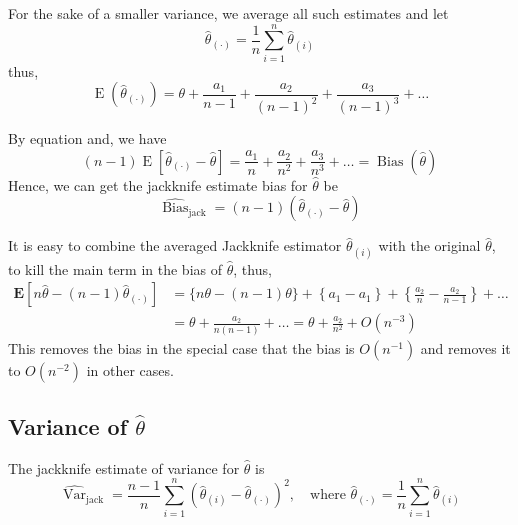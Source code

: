 For the sake of a smaller variance, we average all such estimates and let
\begin{equation}
    \hat{\theta}_{(\cdot)}=\frac{1}{n}\sum_{i=1}^{n}\hat{\theta}_{(i)}
\end{equation}
thus,
\begin{equation}
    \operatorname{E}(\hat{\theta}_{(\cdot)})=\theta+\frac{a_{1}}{n-1}+\frac{a_{2}}{\left(n-1\right)^{2}}+\frac{a_{3}}{\left(n-1\right)^{3}}+\ldots
\end{equation}

By equation and, we have
\begin{equation}
    (n-1)\operatorname{E}\left[\hat{\theta}_{(\cdot)}-\hat{\theta}\right]=\frac{a_{1}}{n}+\frac{a_{2}}{n^{2}}+\frac{a_{3}}{n^{3}}+\ldots=\operatorname{Bias}(\hat{\theta})
\end{equation}
Hence, we can get the jackknife estimate bias for $\hat{\theta}$ be
\begin{equation}
    \widehat{\operatorname{Bias}}_{\text{jack}}=(n-1)\left(\hat{\theta}_{(\cdot)}-\hat{\theta}\right)
\end{equation}

\begin{remark}
    It is easy to combine the averaged Jackknife estimator $\hat{\theta}_{(i)}$ with the original $\hat{\theta}$, to kill the main term in the bias of $\hat{\theta}$, thus,
    \begin{equation}
        \begin{aligned}
            \mathbf{E}\left[n\hat{\theta}-(n-1)\hat{\theta}_{(\mathbf{\cdot})}\right] & =\{n\theta-(n-1)\theta\}+\left\{a_{1}-a_{1}\right\}+\left\{\frac{a_{2}}{n}-\frac{a_{2}}{n-1}\right\}+\ldots \\
                                                                                      & =\theta+\frac{a_{2}}{n(n-1)}+\ldots=\theta+\frac{a_{2}}{n^{2}}+O\left(n^{-3}\right)
        \end{aligned}
    \end{equation}
    This removes the bias in the special case that the bias is $O\left(n^{-1}\right)$ and removes it to $O\left(n^{-2}\right)$ in other cases.
\end{remark}

\subsection{Variance of $\hat{\theta}$}

The jackknife estimate of variance for $\hat{\theta}$ is
\begin{equation}
    \widehat{\operatorname{Var}}_{\text{jack}}=\frac{n-1}{n}\sum_{i=1}^{n}\left(\hat{\theta}_{(i)}-\hat{\theta}_{(\cdot)}\right)^{2},\quad\text{where }\hat{\theta}_{(\cdot)}=\frac{1}{n}\sum_{i=1}^{n}\hat{\theta}_{(i)}
\end{equation}

